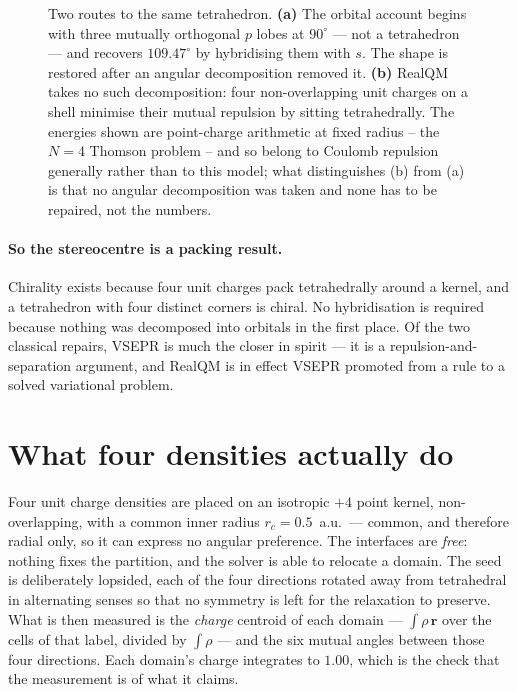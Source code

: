 \documentclass[11pt]{article}
\begin{document}
\begin{figure}[t]
\caption{Two routes to the same tetrahedron. \textbf{(a)} The orbital account begins with
three mutually orthogonal $p$ lobes at $90^\circ$ --- not a tetrahedron --- and recovers
$109.47^\circ$ by hybridising them with $s$. The shape is restored after an angular
decomposition removed it. \textbf{(b)} RealQM takes no such decomposition: four
non-overlapping unit charges on a shell minimise their mutual repulsion by sitting
tetrahedrally. The energies shown are point-charge arithmetic at fixed radius -- the $N=4$
Thomson problem -- and so belong to Coulomb repulsion generally rather than to this model; what
distinguishes (b) from (a) is that no angular decomposition was taken and none has to be repaired,
not the numbers.}
\label{fig:routes}
\end{figure}

\paragraph{So the stereocentre is a packing result.} Chirality exists because four unit charges
pack tetrahedrally around a kernel, and a tetrahedron with four distinct corners is chiral. No
hybridisation is required because nothing was decomposed into orbitals in the first place. Of the
two classical repairs, VSEPR is much the closer in spirit --- it is a repulsion-and-separation
argument, and RealQM is in effect VSEPR promoted from a rule to a solved variational problem.

\section{What four densities actually do}\label{sec:computed}

Four unit charge densities are placed on an isotropic $+4$ point kernel, non-overlapping, with a
common inner radius $r_c = 0.5$~a.u.\ --- common, and therefore radial only, so it can express no
angular preference. The interfaces are \emph{free}: nothing fixes the partition, and the solver is
able to relocate a domain. The seed is deliberately lopsided, each of the four directions rotated
away from tetrahedral in alternating senses so that no symmetry is left for the relaxation to
preserve. What is then measured is the \emph{charge} centroid of each domain --- $\int\!\rho\,
\mathbf{r}$ over the cells of that label, divided by $\int\!\rho$ --- and the six mutual angles
between those four directions. Each domain's charge integrates to $1.00$, which is the check that
the measurement is of what it claims.
\end{document}
